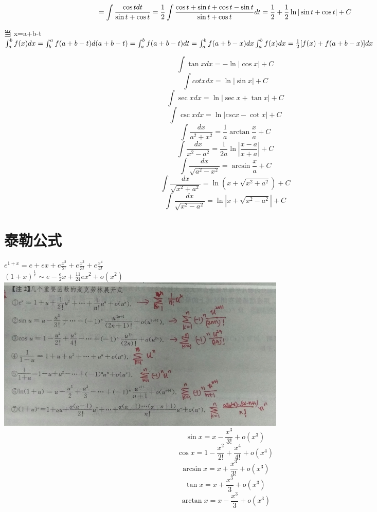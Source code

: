 \documentclass[UTF8]{ctexart}
\begin{document}
$$=\int \frac{\cos t dt}{\sin t + \cos t} \\
=\frac{1}{2} \int \frac{\cos t + \sin t +\cos t - \sin t}{\sin t + \cos t}dt \\
= \frac{1}{2} + \frac{1}{2} \ln | \sin t + \cos t| +C $$

当 x=a+b-t \\
$ \int_a^b f(x) dx = \int_b^a f(a+b-t)d(a+b-t)=\int_a^bf(a+b-t)dt=\int_a^b f(a+b-x) dx \\
\int_a^b f(x) dx = \frac{1}{2} [ f(x) + f(a+b-x) ] dx$

$$ \int \tan x dx = - \ln |\cos x | +C$$
$$ \int cot x dx = \ln|\sin x| +C$$
$$ \int \sec x dx = \ln |\sec x+ \tan x| +C$$
$$ \int \csc x dx = \ln|csc x-\cot x | +C $$
$$ \int \frac{dx}{a^2+x^2}=\frac{1}{a} \arctan \frac{x}{a} +C $$
$$ \int \frac{dx}{x^2-a^2}=\frac{1}{2a} \ln \left| \frac{x-a}{x+a} \right| +C$$
$$ \int \frac{dx}{\sqrt{a^2-x^2}}=\arcsin \frac{x}{a}+C$$
$$ \int \frac {dx}{\sqrt{x^2+a^2}}=\ln {(x+ \sqrt{x^2+a^2})}+C$$
$$ \int \frac{dx}{\sqrt{x^2-a^2}}= \ln | x+\sqrt{x^2-a^2}|+C$$

\section{泰勒公式}
$ e^{1+x}=e+ex+e \frac{x^2}{2!} + e \frac{x^3}{3!}+e\frac{x^4}{4!}$ \\
$ (1+x)^{\frac{1}{x}} \sim e-\frac{e}{2}x+\frac{11}{24}ex^2+o(x^2)$ \\
\includegraphics[width=14cm]{9345E7/F04F85A8EB6EABFF18D6BE71383F2472.jpg}
$$ \sin x=x-\frac{x^3}{3!}+o(x^3)$$
$$ \cos x=1-\frac{x^2}{2!}+\frac{x^4}{4!}+o(x^4)$$
$$ \arcsin x=x+\frac{x^3}{3!}+o(x^3)$$
$$ \tan x=x+\frac{x^3}{3}+o(x^3)$$
$$ \arctan x=x-\frac{x^3}{3}+o(x^3)$$
\end{document}
